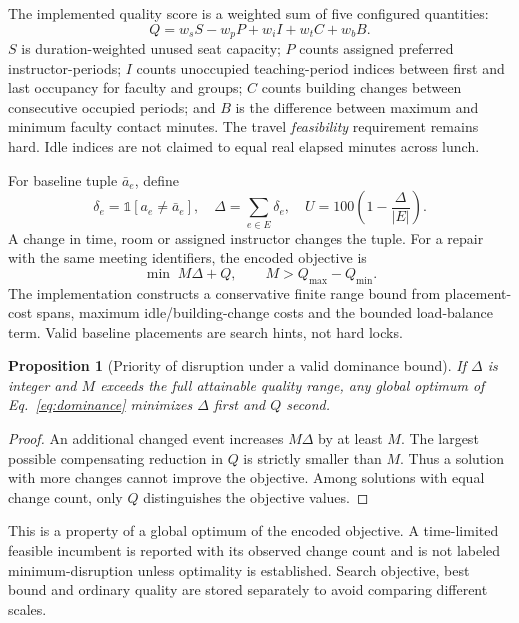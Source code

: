 \documentclass[pdflatex,sn-mathphys-num]{sn-jnl}
\theoremstyle{thmstyleone}
\newtheorem{proposition}[theorem]{Proposition}
\theoremstyle{thmstyletwo}
\theoremstyle{thmstylethree}
\newcommand{\ind}{\mathbb{1}}
\begin{document}
The implemented quality score is a weighted sum of five configured quantities:
\begin{equation}
Q=w_s S-w_p P+w_i I+w_t C+w_b B.\label{eq:quality}
\end{equation}
$S$ is duration-weighted unused seat capacity; $P$ counts assigned preferred instructor-periods; $I$ counts unoccupied teaching-period indices between first and last occupancy for faculty and groups; $C$ counts building changes between consecutive occupied periods; and $B$ is the difference between maximum and minimum faculty contact minutes. The travel \emph{feasibility} requirement remains hard. Idle indices are not claimed to equal real elapsed minutes across lunch.

For baseline tuple $\bar a_e$, define
\begin{equation}
\delta_e=\ind[a_e\ne\bar a_e],\quad
\Delta=\sum_{e\in E}\delta_e,\quad
U=100\left(1-\frac{\Delta}{|E|}\right).\label{eq:repair}
\end{equation}
A change in time, room or assigned instructor changes the tuple. For a repair with the same meeting identifiers, the encoded objective is
\begin{equation}
\min\; M\Delta+Q,\qquad M>Q_{\max}-Q_{\min}.\label{eq:dominance}
\end{equation}
The implementation constructs a conservative finite range bound from placement-cost spans, maximum idle/building-change costs and the bounded load-balance term. Valid baseline placements are search hints, not hard locks.

\begin{proposition}[Priority of disruption under a valid dominance bound]
If $\Delta$ is integer and $M$ exceeds the full attainable quality range, any global optimum of Eq.~\eqref{eq:dominance} minimizes $\Delta$ first and $Q$ second.
\end{proposition}
\begin{proof}
An additional changed event increases $M\Delta$ by at least $M$. The largest possible compensating reduction in $Q$ is strictly smaller than $M$. Thus a solution with more changes cannot improve the objective. Among solutions with equal change count, only $Q$ distinguishes the objective values.
\end{proof}
This is a property of a global optimum of the encoded objective. A time-limited feasible incumbent is reported with its observed change count and is not labeled minimum-disruption unless optimality is established. Search objective, best bound and ordinary quality are stored separately to avoid comparing different scales.
\end{document}

